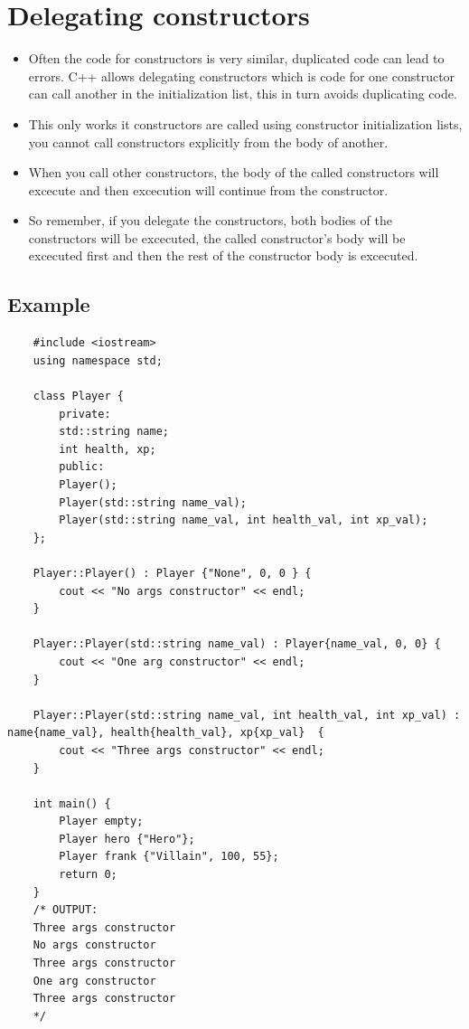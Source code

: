 \section{Delegating constructors}
\begin{itemize}
    \item Often the code for constructors is very similar, duplicated code can lead to errors. C++ allows delegating constructors which is code for one constructor can call another in the initialization list, this in turn avoids duplicating code.
    \item This only works it constructors are called using constructor initialization lists, you cannot call constructors explicitly from the body of another. 
    \item When you call other constructors, the body of the called constructors will excecute and then excecution will continue from the constructor.
    \item So remember, if you delegate the constructors, both bodies of the constructors will be excecuted, the called constructor's body will be excecuted first and then the rest of the constructor body is excecuted.
\end{itemize}

\subsection{Example}
\begin{verbatim}
    #include <iostream>
    using namespace std;

    class Player {
        private:
        std::string name;
        int health, xp;
        public:
        Player();
        Player(std::string name_val);
        Player(std::string name_val, int health_val, int xp_val);
    };

    Player::Player() : Player {"None", 0, 0 } {
        cout << "No args constructor" << endl;
    }

    Player::Player(std::string name_val) : Player{name_val, 0, 0} {
        cout << "One arg constructor" << endl;
    }

    Player::Player(std::string name_val, int health_val, int xp_val) : name{name_val}, health{health_val}, xp{xp_val}  {
        cout << "Three args constructor" << endl;
    }

    int main() {
        Player empty; 
        Player hero {"Hero"}; 
        Player frank {"Villain", 100, 55}; 
        return 0;
    }
    /* OUTPUT:
    Three args constructor
    No args constructor
    Three args constructor
    One arg constructor
    Three args constructor
    */
\end{verbatim}


